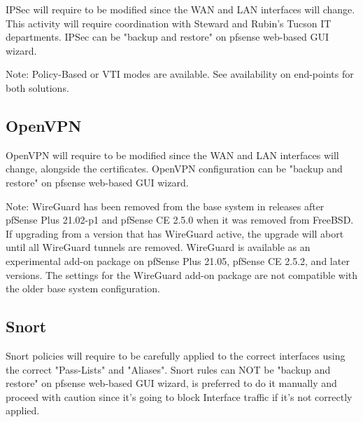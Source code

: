 IPSec will require to be modified since the WAN and LAN interfaces will change. This activity will require coordination with Steward and Rubin's Tucson IT departments. IPSec can be "backup and restore" on pfsense web-based GUI wizard.

Note: Policy-Based or VTI modes are available. See availability on end-points for both solutions.

\subsection{OpenVPN}

OpenVPN will require to be modified since the WAN and LAN interfaces will change, alongside the certificates. OpenVPN configuration can be "backup and restore" on pfsense web-based GUI wizard.

Note: WireGuard has been removed from the base system in releases after pfSense Plus 21.02-p1 and pfSense CE 2.5.0 when it was removed from FreeBSD. If upgrading from a version that has WireGuard active, the upgrade will abort until all WireGuard tunnels are removed. WireGuard is available as an experimental add-on package on pfSense Plus 21.05, pfSense CE 2.5.2, and later versions. The settings for the WireGuard add-on package are not compatible with the older base system configuration.

\subsection{Snort}

Snort policies will require to be carefully applied to the correct interfaces using the correct "Pass-Lists" and "Aliases". Snort rules can NOT be "backup and restore" on pfsense web-based GUI wizard, is preferred to do it manually and proceed with caution since it's going to block Interface traffic if it's not correctly applied.